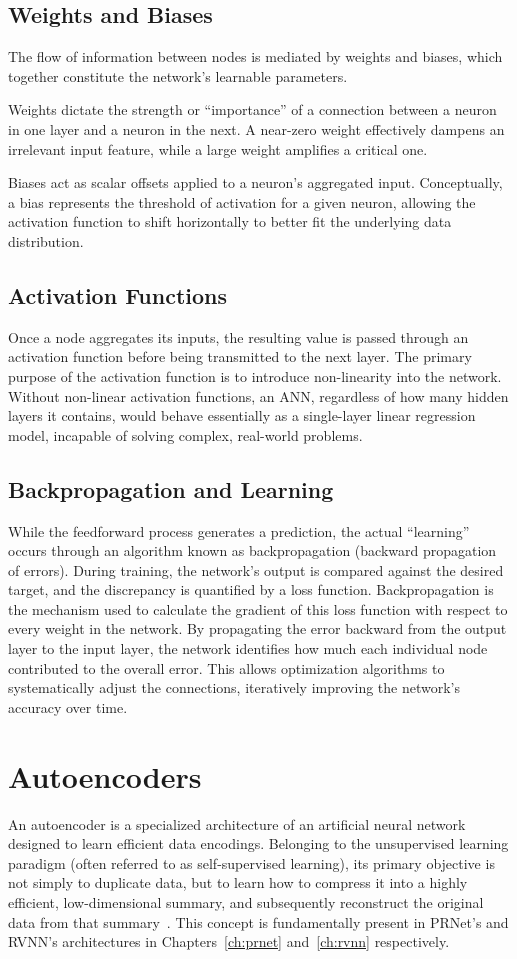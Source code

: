 \subsection{Weights and Biases}
The flow of information between nodes is mediated by weights and biases, which together constitute the network's learnable parameters.

Weights dictate the strength or ``importance'' of a connection between a neuron in one layer and a neuron in the next. A near-zero weight effectively dampens an irrelevant input feature, while a large weight amplifies a critical one.

Biases act as scalar offsets applied to a neuron's aggregated input. Conceptually, a bias represents the threshold of activation for a given neuron, allowing the activation function to shift horizontally to better fit the underlying data distribution.

\subsection{Activation Functions}
Once a node aggregates its inputs, the resulting value is passed through an activation function before being transmitted to the next layer. The primary purpose of the activation function is to introduce non-linearity into the network. Without non-linear activation functions, an ANN, regardless of how many hidden layers it contains, would behave essentially as a single-layer linear regression model, incapable of solving complex, real-world problems.

\subsection{Backpropagation and Learning}
While the feedforward process generates a prediction, the actual ``learning'' occurs through an algorithm known as backpropagation (backward propagation of errors). During training, the network's output is compared against the desired target, and the discrepancy is quantified by a loss function. Backpropagation is the mechanism used to calculate the gradient of this loss function with respect to every weight in the network. By propagating the error backward from the output layer to the input layer, the network identifies how much each individual node contributed to the overall error. This allows optimization algorithms to systematically adjust the connections, iteratively improving the network's accuracy over time.

\section{Autoencoders}
An autoencoder is a specialized architecture of an artificial neural network designed to learn efficient data encodings. Belonging to the unsupervised learning paradigm (often referred to as self-supervised learning), its primary objective is not simply to duplicate data, but to learn how to compress it into a highly efficient, low-dimensional summary, and subsequently reconstruct the original data from that summary~\cite{wiki_autoencoder}. This concept is fundamentally present in PRNet's and RVNN's architectures in Chapters~\ref{ch:prnet} and~\ref{ch:rvnn} respectively.

